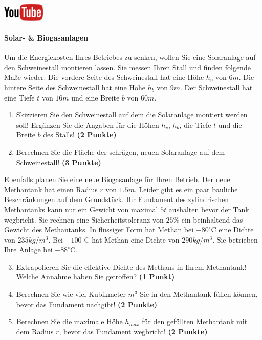 \documentclass[a4paper, 9pt]{scrartcl}\usepackage[]{graphicx}\usepackage[]{xcolor}
\begin{document}
\hfill\href{https://youtu.be/aBxLkdF-c4M}{\includegraphics[width =
  2cm]{img/youtube}} %
\hspace{2Ex}

\paragraph{Solar- \& Biogasanlagen}



Um die Energiekosten Ihres Betriebes zu senken, wollen Sie eine Solaranlage
auf den Schweinestall montieren lassen. Sie messen Ihren Stall und finden
folgende Ma{\ss}e wieder. Die vordere Seite des Schweinestall hat eine H{\"o}he
$h_v$ von $6m$. Die hintere Seite des Schweinestall hat eine
H{\"o}he $h_b$ von $9m$. Der Schweinestall hat eine Tiefe $t$ von
$16m$ und eine Breite $b$ von $60m$.

\begin{enumerate}
\item Skizzieren Sie den Schweinestall auf dem die Solaranlage montiert
  werden soll! Erg{\"a}nzen Sie die Angaben f{\"u}r die H{\"o}hen $h_v$, $h_b$, die
  Tiefe $t$ und die Breite $b$ des Stalls!  \textbf{(2 Punkte)}
\item Berechnen Sie die Fl{\"a}che der schr{\"a}gen, neuen Solaranlage auf dem
  Schweinestall! \textbf{(3 Punkte)}
\end{enumerate}

Ebenfalls planen Sie eine neue Biogasanlage f{\"u}r Ihren Betrieb. Der neue
Methantank hat einen Radius $r$ von $1.5m$. Leider gibt es ein
paar bauliche Beschr{\"a}nkungen auf dem Grundst{\"u}ck. Ihr Fundament des
zylindrischen Methantanks kann nur ein Gewicht von maximal
$5t$ aushalten bevor der Tank wegbricht. Sie rechnen eine
Sicherheitstoleranz von $25\%$ ein beinhaltend das Gewicht des
Methantanks. In fl{\"u}ssiger Form hat
Methan bei $-80^\circ\text{C}$ eine Dichte von
$235kg/m^3$. Bei $-100^\circ\text{C}$ hat Methan eine Dichte
von $290kg/m^3$. Sie betrieben Ihre Anlage bei
$-88^\circ\text{C}$.

\begin{enumerate}
  \setcounter{enumi}{2}
\item Extrapolieren Sie die effektive Dichte des Methans in Ihrem
  Methantank! Welche Annahme haben Sie getroffen? \textbf{(1 Punkt)}
\item Berechnen Sie wie viel Kubikmeter $m^3$ Sie in den Methantank f{\"u}llen
  k{\"o}nnen, bevor das Fundament nachgibt! \textbf{(2 Punkte)}
\item Berechnen Sie die maximale H{\"o}he $h_{max}$ f{\"u}r den gef{\"u}llten
  Methantank mit dem Radius $r$, bevor das Fundament wegbricht! \textbf{(2
    Punkte)}
\end{enumerate}
\end{document}
